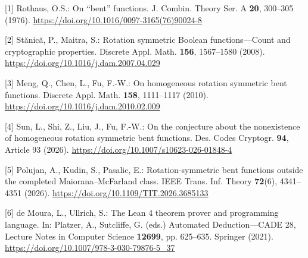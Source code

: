 \documentclass[11pt,a4paper]{article}
\begin{document}
[1] Rothaus, O.S.: On ``bent'' functions. J. Combin. Theory Ser. A \textbf{20}, 300--305 (1976). \url{https://doi.org/10.1016/0097-3165(76)90024-8}

[2] St\u{a}nic\u{a}, P., Maitra, S.: Rotation symmetric Boolean functions---Count and cryptographic properties. Discrete Appl. Math. \textbf{156}, 1567--1580 (2008). \url{https://doi.org/10.1016/j.dam.2007.04.029}

[3] Meng, Q., Chen, L., Fu, F.-W.: On homogeneous rotation symmetric bent functions. Discrete Appl. Math. \textbf{158}, 1111--1117 (2010). \url{https://doi.org/10.1016/j.dam.2010.02.009}

[4] Sun, L., Shi, Z., Liu, J., Fu, F.-W.: On the conjecture about the nonexistence of homogeneous rotation symmetric bent functions. Des. Codes Cryptogr. \textbf{94}, Article 93 (2026). \url{https://doi.org/10.1007/s10623-026-01848-4}

[5] Polujan, A., Kudin, S., Pasalic, E.: Rotation-symmetric bent functions outside the completed Maiorana--McFarland class. IEEE Trans. Inf. Theory \textbf{72}(6), 4341--4351 (2026). \url{https://doi.org/10.1109/TIT.2026.3685133}

[6] de Moura, L., Ullrich, S.: The Lean 4 theorem prover and programming language. In: Platzer, A., Sutcliffe, G. (eds.) Automated Deduction---CADE 28, Lecture Notes in Computer Science \textbf{12699}, pp. 625--635. Springer (2021). \url{https://doi.org/10.1007/978-3-030-79876-5\_37}
\end{document}
